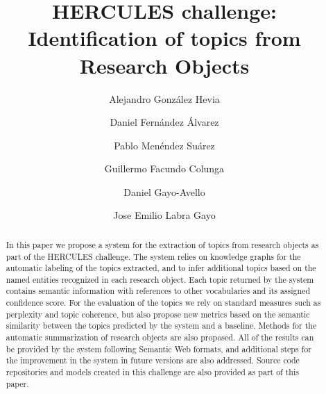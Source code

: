 \documentclass[runningheads]{llncs}
\begin{document}
%
\title{HERCULES challenge: Identification of topics from Research Objects}
%
%
\author{Alejandro Gonz\'{a}lez Hevia \and Daniel Fernández Álvarez \and Pablo Menéndez Suárez \and Guillermo Facundo Colunga \and Daniel Gayo-Avello \and Jose Emilio Labra Gayo
}
%


\maketitle

\begin{abstract}
In this paper we propose a system for the extraction of topics from research objects as part of the HERCULES challenge. The system relies on knowledge graphs for the automatic labeling of the topics extracted, and to infer additional topics based on the named entities recognized in each research object. Each topic returned by the system contains semantic information with references to other vocabularies and its assigned confidence score. For the evaluation of the topics we rely on standard measures such as perplexity and topic coherence, but also propose new metrics based on the semantic similarity between the topics predicted by the system and a baseline. Methods for the automatic summarization of research objects are also proposed. All of the results can be provided by the system following Semantic Web formats, and additional steps for the improvement in the system in future versions are also addressed. Source code repositories and models created in this challenge are also provided as part of this paper.

\end{abstract}
%
%
%
\end{document}

